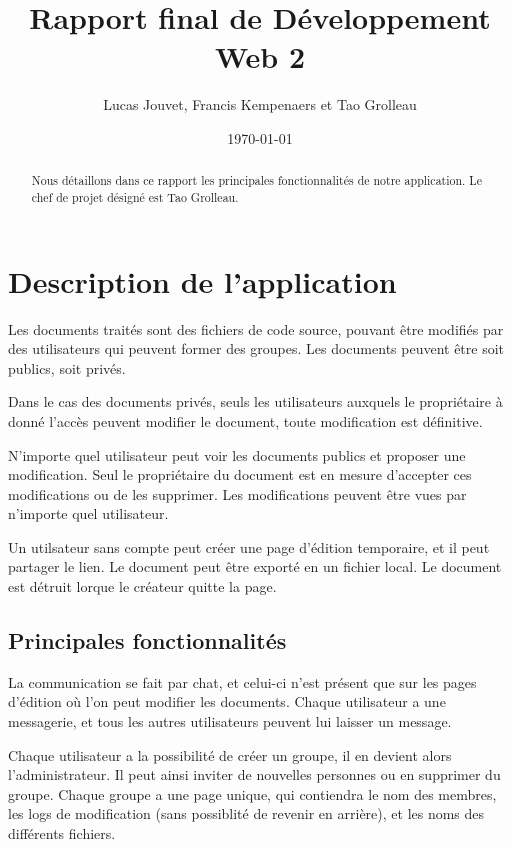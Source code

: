 \documentclass[a4paper, 12pt]{article}
\title{Rapport final de Développement Web 2}
\author{Lucas Jouvet, Francis Kempenaers et Tao Grolleau}
\date{\today}
\begin{document}
\maketitle

\begin{abstract}
  Nous détaillons dans ce rapport les principales fonctionnalités de notre application. Le chef de projet désigné est Tao Grolleau.
\end{abstract}

\newpage

\section{Description de l'application}

Les documents traités sont des fichiers de code source, pouvant être modifiés par des utilisateurs qui peuvent former des groupes. Les documents peuvent être soit publics, soit privés. 

Dans le cas des documents privés, seuls les utilisateurs auxquels le propriétaire à donné l'accès peuvent modifier le document, toute modification est définitive. 

N'importe quel utilisateur peut voir les documents publics et proposer une modification. Seul le propriétaire du document est en mesure d'accepter ces modifications ou de les supprimer. Les modifications peuvent être vues par n'importe quel utilisateur.

Un utilsateur sans compte peut créer une page d'édition temporaire, et il peut partager le lien. Le document peut être exporté en un fichier local. Le document est détruit lorque le créateur quitte la page.

\subsection{Principales fonctionnalités}

La communication se fait par chat, et celui-ci n'est présent que sur les pages d'édition où l'on peut modifier les documents. Chaque utilisateur a une messagerie, et tous les autres utilisateurs peuvent lui laisser un message.

Chaque utilisateur a la possibilité de créer un groupe, il en devient alors l'administrateur. Il peut ainsi inviter de nouvelles personnes ou en supprimer du groupe. Chaque groupe a une page unique, qui contiendra le nom des membres, les logs de modification (sans possiblité de revenir en arrière), et les noms des différents fichiers.
\end{document}
